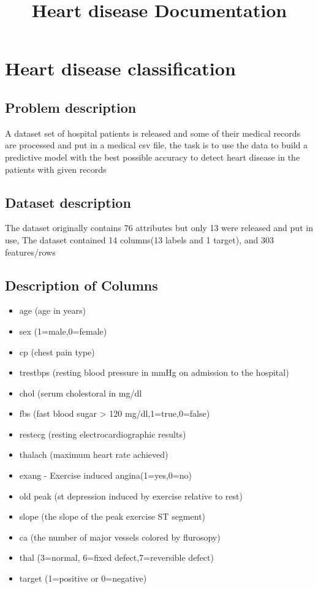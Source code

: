 \documentclass[11pt]{article}
\title{Heart disease Documentation}
\providecommand{\tightlist}{%
      \setlength{\itemsep}{0pt}\setlength{\parskip}{0pt}}
\begin{document}
    
    
    \maketitle
    
    

    
    \section{Heart disease
classification}\label{heart-disease-classification}

    \subsection{Problem description}\label{problem-description}

    A dataset set of hospital patients is released and some of their medical
records are processed and put in a medical csv file, the task is to use
the data to build a predictive model with the best possible accuracy to
detect heart disease in the patients with given records

    \subsection{Dataset description}\label{dataset-description}

    The dataset originally contains 76 attributes but only 13 were released
and put in use, The dataset contained 14 columns(13 labels and 1
target), and 303 features/rows

    \subsection{Description of Columns}\label{description-of-columns}

    \begin{itemize}
\tightlist
\item
  age (age in years)
\item
  sex (1=male,0=female)
\item
  cp (chest pain type)
\item
  trestbps (resting blood pressure in mmHg on admission to the hospital)
\item
  chol (serum cholestoral in mg/dl
\item
  fbs (fast blood sugar \textgreater{} 120 mg/dl,1=true,0=false)
\item
  restecg (resting electrocardiographic results)
\item
  thalach (maximum heart rate achieved)
\item
  exang - Exercise induced angina(1=yes,0=no)
\item
  old peak (st depression induced by exercise relative to rest)
\item
  slope (the slope of the peak exercise ST segment)
\item
  ca (the number of major vessels colored by flurosopy)
\item
  thal (3=normal, 6=fixed defect,7=reversible defect)
\item
  target (1=positive or 0=negative)
\end{itemize}
\end{document}
